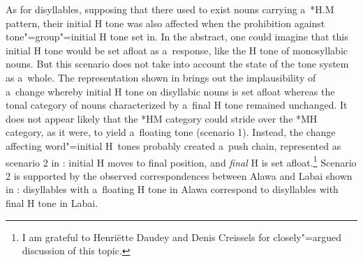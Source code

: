 As for disyllables, supposing that there used to exist nouns carrying a~*H.M pattern, their initial H tone was also affected when the prohibition against tone"=group"=initial H
tone set in. In the abstract, one could imagine that this initial H tone would be set afloat as a~response, like the H tone of monosyllabic nouns. But this scenario does not take into account the state of the tone system as a~whole. The representation shown in  brings out the implausibility of a~change whereby initial H tone on disyllabic nouns is set afloat whereas the tonal category of nouns characterized by a~final H tone remained unchanged. It does not appear likely that the *HM category could stride over the *MH category, as it were, to yield a~floating tone (scenario 1). Instead, the change affecting word"=initial H~tones probably created a~push chain, represented as scenario 2 in : initial H moves to final position, and \textit{final} H is set afloat.\footnote{I am grateful to Henriëtte Daudey and Denis Creissels for closely"=argued discussion of this topic.} Scenario 2 is supported by the observed correspondences between Alawa and Labai shown in : disyllables with a~floating H tone in Alawa correspond to disyllables with final H tone in Labai. 
 
